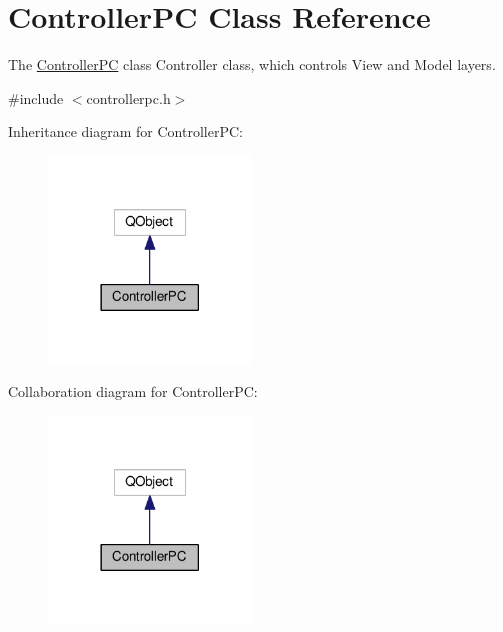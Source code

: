 \hypertarget{class_controller_p_c}{}\section{Controller\+PC Class Reference}
\label{class_controller_p_c}


The \hyperlink{class_controller_p_c}{Controller\+PC} class Controller class, which controls View and Model layers.  




{\ttfamily \#include $<$controllerpc.\+h$>$}



Inheritance diagram for Controller\+PC\+:
\nopagebreak
\begin{figure}[H]
\begin{center}
\leavevmode
\includegraphics[width=153pt]{class_controller_p_c__inherit__graph}
\end{center}
\end{figure}


Collaboration diagram for Controller\+PC\+:
\nopagebreak
\begin{figure}[H]
\begin{center}
\leavevmode
\includegraphics[width=153pt]{class_controller_p_c__coll__graph}
\end{center}
\end{figure}
